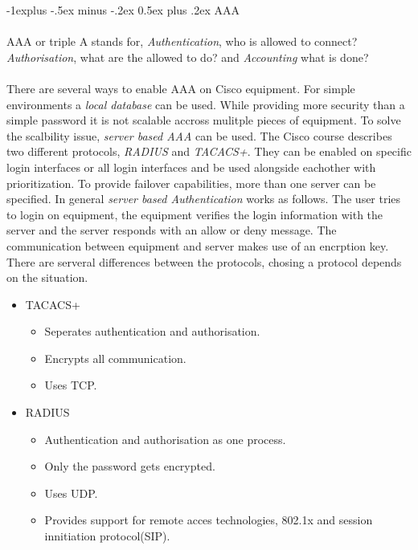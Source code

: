 \documentclass[10pt,landscape]{article}
\makeatletter
\renewcommand{\subsection}{\@startsection{subsection}{2}{0mm}%
                                {-1explus -.5ex minus -.2ex}%
                                {0.5ex plus .2ex}%
                                {\normalfont\normalsize\bfseries}}
\makeatother
\begin{document}
\begin{multicols}{3}
\subsection{AAA}
\paragraph{}
AAA or triple A stands for, \textit{Authentication}, who is allowed to connect? \textit{Authorisation}, what are the allowed to do?
and \textit{Accounting} what is done?
\paragraph{}
There are several ways to enable AAA on Cisco equipment. For simple environments a \textit{local database} can be used.
While providing more security than a simple password it is not scalable accross mulitple pieces of equipment. To solve
the scalbility issue, \textit{server based AAA} can be used. The Cisco course describes two different protocols,
\textit{RADIUS} and \textit{TACACS+}. They can be enabled on specific login interfaces or all login interfaces and be
used alongside eachother with prioritization. To provide failover capabilities, more than one server can be specified.
In general \textit{server based Authentication} works as follows. The user tries to login on equipment,
the equipment verifies the login information with the server and the server responds with an allow or deny message.
The communication between equipment and server makes use of an encrption key.
There are serveral differences between the protocols, chosing a protocol depends on the situation.
\begin{itemize}
	\item TACACS+
	\begin{itemize}
		\item Seperates authentication and authorisation.
		\item Encrypts all communication.
		\item Uses TCP.
	\end{itemize}
	\item RADIUS
	\begin{itemize}
		\item Authentication and authorisation as one process.
		\item Only the password gets encrypted.
		\item Uses UDP.
		\item Provides support for remote acces technologies, 802.1x and session innitiation protocol(SIP).
	\end{itemize}
\end{itemize}

\end{multicols}
\end{document}
